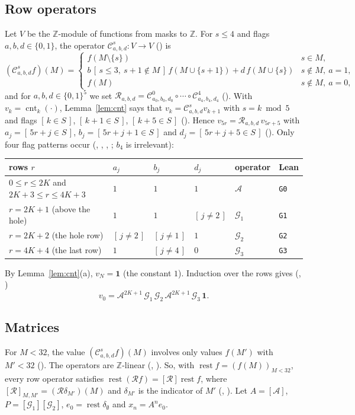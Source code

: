 \documentclass[11pt]{amsart}
\theoremstyle{plain}
\theoremstyle{definition}
\newcommand{\Z}{\mathbb{Z}}
\newcommand{\ib}[1]{[\,#1\,]}
\newcommand{\cnt}{\operatorname{cnt}}
\newcommand{\rest}{\operatorname{rest}}
\newcommand{\cA}{\mathcal{A}}
\newcommand{\cG}{\mathcal{G}}
\newcommand{\cC}{\mathcal{C}}
\newcommand{\cR}{\mathcal{R}}
\newcommand{\one}{\mathbf{1}}
\begin{document}
\subsection{Row operators}
Let $V$ be the $\Z$-module of functions from masks to $\Z$. For $s\le4$ and flags $a,b,d\in\{0,1\}$, the operator $\cC^{s}_{a,b,d}\colon V\to V$ () is
\[
  (\cC^s_{a,b,d} f)(M)=\begin{cases}
  f(M\setminus\{s\}) & s\in M,\\
  b\,\ib{s\le3,\ s+1\notin M}\,f(M\cup\{s+1\})+d\,f(M\cup\{s\}) & s\notin M,\ a=1,\\
  f(M) & s\notin M,\ a=0,
  \end{cases}
\]
and for $a,b,d\in\{0,1\}^5$ we set $\cR_{a,b,d}=\cC^0_{a_0,b_0,d_0}\circ\cdots\circ\cC^4_{a_4,b_4,d_4}$ (). With $v_k=\cnt_k(\cdot)$, Lemma~\ref{lem:cnt} says that $v_k=\cC^{s}_{a,b,d}v_{k+1}$ with $s=k\bmod5$ and flags $\ib{k\in S}$, $\ib{k+1\in S}$, $\ib{k+5\in S}$ (). Hence $v_{5r}=\cR_{a,b,d}\,v_{5r+5}$ with $a_j=\ib{5r+j\in S}$, $b_j=\ib{5r+j+1\in S}$ and $d_j=\ib{5r+j+5\in S}$ (). Only four flag patterns occur (, , , ; $b_4$ is irrelevant):
\begin{center}\small
\begin{tabular}{llllll}
\toprule
rows $r$ & $a_j$ & $b_j$ & $d_j$ & operator & Lean\\
\midrule
$0\le r\le2K$ and $2K+3\le r\le4K+3$ & $1$ & $1$ & $1$ & $\cA$ & \texttt{G0}\\
$r=2K+1$ (above the hole) & $1$ & $1$ & $\ib{j\ne2}$ & $\cG_1$ & \texttt{G1}\\
$r=2K+2$ (the hole row) & $\ib{j\ne2}$ & $\ib{j\ne1}$ & $1$ & $\cG_2$ & \texttt{G2}\\
$r=4K+4$ (the last row) & $1$ & $\ib{j\ne4}$ & $0$ & $\cG_3$ & \texttt{G3}\\
\bottomrule
\end{tabular}
\end{center}
By Lemma~\ref{lem:cnt}(a), $v_N=\one$ (the constant $1$). Induction over the rows gives (, )
\begin{equation}\label{eq:rows}
  v_0=\cA^{2K+1}\,\cG_1\,\cG_2\,\cA^{2K+1}\,\cG_3\,\one .
\end{equation}

\subsection{Matrices}
For $M<32$, the value $(\cC^s_{a,b,d}f)(M)$ involves only values $f(M')$ with $M'<32$ (). The operators are $\Z$-linear (, ). So, with $\rest f=(f(M))_{M<32}$, every row operator satisfies $\rest(\cR f)=[\cR]\rest f$, where $[\cR]_{M,M'}=(\cR\delta_{M'})(M)$ and $\delta_{M'}$ is the indicator of $M'$ (, ). Let $A=[\cA]$, $P=[\cG_1][\cG_2]$, $e_0=\rest\delta_\emptyset$ and $x_n=A^ne_0$.
\end{document}
